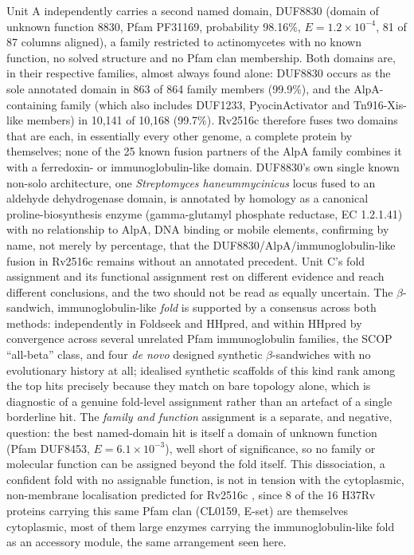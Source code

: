 \documentclass[11pt,a4paper]{article}
\begin{document}
Unit A independently carries a second named domain, DUF8830 (domain of unknown function 8830,
Pfam PF31169, probability 98.16\%, $E=1.2\times10^{-4}$, 81 of 87 columns aligned), a family
restricted to actinomycetes with no known
function, no solved structure and no Pfam clan membership. Both domains are, in their respective
families, almost always found alone: DUF8830 occurs as the sole annotated domain in 863 of 864
family members (99.9\%), and the AlpA-containing family (which also includes DUF1233,
PyocinActivator and Tn916-Xis-like members) in 10{,}141 of 10{,}168 (99.7\%). Rv2516c therefore
fuses two domains that are each, in essentially every other genome, a complete protein by
themselves; none of the 25 known fusion partners of the AlpA family combines it with a ferredoxin-
or immunoglobulin-like domain. DUF8830's own single known non-solo architecture, one
\textit{Streptomyces haneummycinicus} locus fused to an aldehyde dehydrogenase domain, is annotated
by homology as a canonical proline-biosynthesis enzyme (gamma-glutamyl phosphate reductase, EC
1.2.1.41) with no relationship to AlpA, DNA binding or mobile elements, confirming by name, not
merely by percentage, that the DUF8830/AlpA/immunoglobulin-like fusion in Rv2516c remains without an
annotated precedent. Unit C's fold assignment and its functional assignment rest on
different evidence and reach different conclusions, and the two should not be read as equally
uncertain. The $\beta$-sandwich, immunoglobulin-like \emph{fold} is supported by a consensus
across both methods: independently in Foldseek and HHpred, and within HHpred by convergence across
several unrelated Pfam immunoglobulin families, the SCOP ``all-beta'' class, and four
\emph{de novo} designed synthetic $\beta$-sandwiches with no evolutionary history at all; idealised
synthetic scaffolds of this kind rank among the top hits precisely because they match on bare
topology alone, which is diagnostic of a genuine fold-level assignment rather than an artefact of
a single borderline hit. The \emph{family and function} assignment is a separate, and negative,
question: the best named-domain hit is itself a domain of unknown function (Pfam DUF8453,
$E=6.1\times10^{-3}$), well short of significance, so no family or molecular function can be
assigned beyond the fold itself. This dissociation, a confident fold with no assignable function,
is not in tension with the cytoplasmic, non-membrane localisation predicted for Rv2516c
\citep{hallgren2022deeptmhmm}, since 8 of the 16 H37Rv proteins carrying this same Pfam clan
(CL0159, E-set) are themselves cytoplasmic, most of them large enzymes carrying the
immunoglobulin-like fold as an accessory module, the same arrangement seen here.
\end{document}
